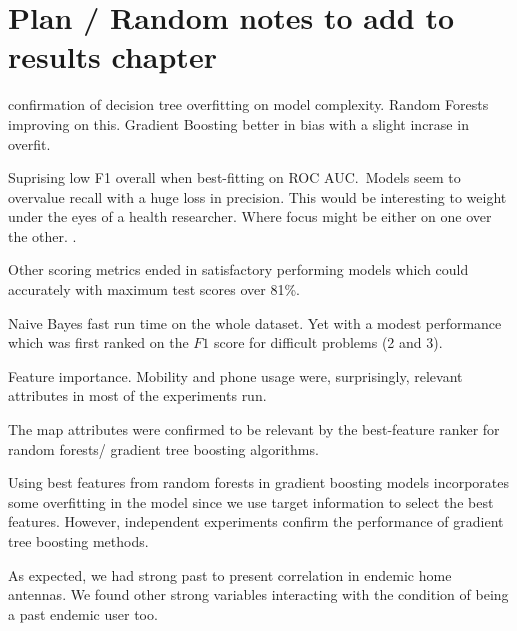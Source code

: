 \section{Plan / Random notes to add to results chapter}

\begin{description}
    \item confirmation of decision tree overfitting on model complexity. Random Forests improving on this. Gradient Boosting better in bias with a slight incrase in overfit.
    \item Suprising low F1 overall when best-fitting on ROC AUC.\ Models seem to overvalue recall with a huge loss in precision. This would be interesting to weight under the eyes of a health researcher. Where focus might be either on one over the other. .
    \item Other scoring metrics ended in satisfactory performing models which could accurately with maximum test scores over 81\%.
    \item Naive Bayes fast run time on the whole dataset. Yet with a modest performance which was first ranked on the $F1$ score for difficult problems (2 and 3).
    \item Feature importance. Mobility and phone usage were, surprisingly, relevant attributes in most of the experiments run.
    \item The map attributes were confirmed to be relevant by the best-feature ranker for random forests/ gradient tree boosting algorithms.
    \item Using best features from random forests in gradient boosting models incorporates some overfitting in the model since we use target information to select the best features. However, independent experiments confirm the performance of gradient tree boosting methods.
    \item As expected, we had strong past to present correlation in endemic home antennas. We found other strong variables interacting with the condition of being a past endemic user too.


\end{description}


